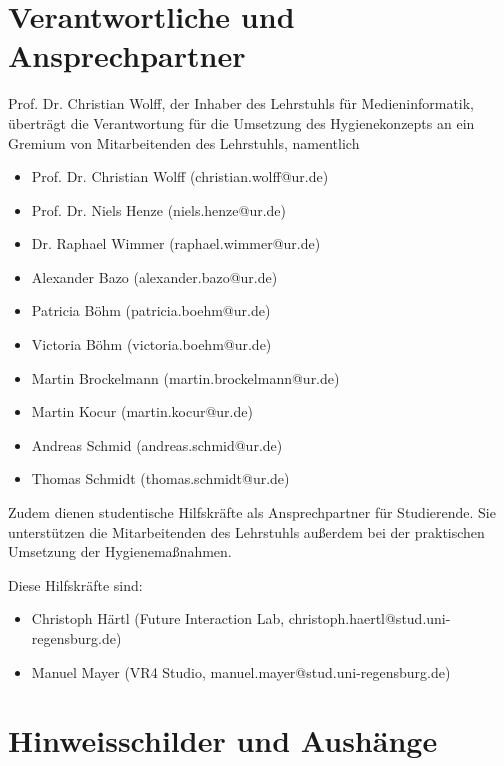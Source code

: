\clearpage

\appendix

\section{Verantwortliche und Ansprechpartner}\label{app:verantwortliche}

\noindent
Prof. Dr. Christian Wolff, der Inhaber des Lehrstuhls für Medieninformatik, überträgt die Verantwortung für die Umsetzung des Hygienekonzepts an ein Gremium von Mitarbeitenden des Lehrstuhls, namentlich

\begin{itemize}
    \item Prof. Dr. Christian Wolff (christian.wolff@ur.de)
    \item Prof. Dr. Niels Henze (niels.henze@ur.de)
    \item Dr. Raphael Wimmer (raphael.wimmer@ur.de)
    \item Alexander Bazo (alexander.bazo@ur.de)
    \item Patricia Böhm (patricia.boehm@ur.de)
    \item Victoria Böhm (victoria.boehm@ur.de)
    \item Martin Brockelmann (martin.brockelmann@ur.de)
    \item Martin Kocur (martin.kocur@ur.de)
    \item Andreas Schmid (andreas.schmid@ur.de)
    \item Thomas Schmidt (thomas.schmidt@ur.de)
\end{itemize}

\noindent
Zudem dienen studentische Hilfskräfte als Ansprechpartner für Studierende.
Sie unterstützen die Mitarbeitenden des Lehrstuhls außerdem bei der praktischen Umsetzung der Hygienemaßnahmen.

Diese Hilfskräfte sind:

\begin{itemize}
    \item Christoph Härtl (Future Interaction Lab, christoph.haertl@stud.uni-regensburg.de)
    \item Manuel Mayer (VR4 Studio, manuel.mayer@stud.uni-regensburg.de)
\end{itemize}

\section{Hinweisschilder und Aushänge}\label{app:hinweisschilder}

